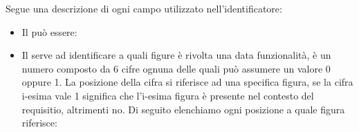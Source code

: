 \noindent
Segue una descrizione di ogni campo utilizzato nell'identificatore:
\begin{itemize}
	\item Il  può essere:

	\item Il  serve ad identificare a quali figure è rivolta una data funzionalità, è un numero composto da 6 cifre ognuna delle quali può assumere un valore 0 oppure 1. La posizione della cifra si riferisce ad una specifica figura, se la cifra i-esima vale 1 significa che l'i-esima figura è presente nel contesto del requisitio, altrimenti no.
	Di seguito elenchiamo ogni posizione a quale figura riferisce: 


\end{itemize}
